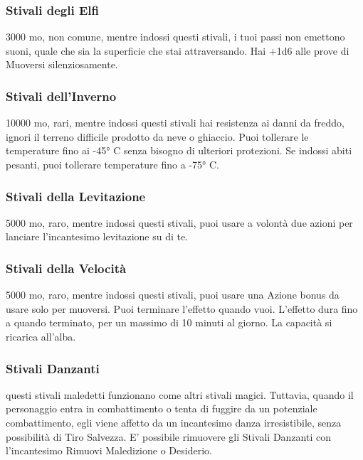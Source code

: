\begin{multicols}{2}
	\subsubsection*{Stivali degli Elfi}
	3000 mo, non comune, mentre indossi questi stivali, i tuoi passi non emettono suoni, quale che sia la superficie che stai attraversando. Hai +1d6 alle prove di Muoversi silenziosamente.

	\subsubsection*{Stivali dell'Inverno}
	10000 mo, rari, mentre indossi questi stivali hai resistenza ai danni da freddo, ignori il terreno difficile prodotto da neve o ghiaccio. Puoi tollerare le temperature fino ai -45° C senza bisogno di ulteriori protezioni. Se indossi abiti pesanti, puoi tollerare temperature fino a -75° C.

	\subsubsection*{Stivali della Levitazione}
	5000 mo, raro, mentre indossi questi stivali, puoi usare a volontà due azioni per lanciare l'incantesimo levitazione su di te.

	\subsubsection*{Stivali della Velocità}
	5000 mo, raro, mentre indossi questi stivali, puoi usare una Azione bonus da usare solo per muoversi. Puoi terminare l'effetto quando vuoi. L'effetto dura fino a quando terminato, per un massimo di 10 minuti al giorno. La capacità si ricarica all'alba.

	\subsubsection*{Stivali Danzanti}
	questi stivali maledetti funzionano come altri stivali magici. Tuttavia, quando il personaggio entra in combattimento o tenta di fuggire da un potenziale combattimento, egli viene affetto da un incantesimo danza irresistibile, senza possibilità di Tiro Salvezza. E' possibile rimuovere gli Stivali Danzanti con l'incantesimo Rimuovi Maledizione o Desiderio.


\end{multicols}
